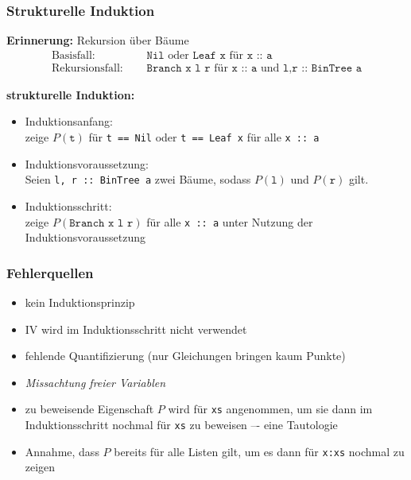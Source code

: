 \documentclass{beamer}
\begin{document}
\begin{frame} \frametitle{Strukturelle Induktion}
	\footnotesize
	
	\textbf{Erinnerung:} Rekursion über Bäume
	\begin{equation*}
		\begin{aligned}
			\text{Basisfall: } \quad &\texttt{Nil} \text{ oder } \texttt{Leaf x} \text{ für } \texttt{x :: a} \\
			\text{Rekursionsfall: }\quad &\texttt{Branch x l r} \text{ für } \texttt{x :: a} \text{ und } \texttt{l,r :: BinTree a}
		\end{aligned}
	\end{equation*}
	\pause

	\begin{center}
	\end{center}
	\pause
	
	\textbf{strukturelle Induktion:} \vspace{-0.5\baselineskip}
	\begin{itemize}
		\item \textcolor{cdblue}{Induktionsanfang}: \\
		zeige $P(\texttt{t})$ für \texttt{t == Nil} oder \texttt{t == Leaf x} für alle \texttt{x :: a}
		\pause
		\item \textcolor{cdblue}{Induktionsvoraussetzung}:\\
		Seien \texttt{l, r :: BinTree a} zwei Bäume, sodass $P(\texttt{l})$ und $P(\texttt{r})$ gilt. \pause
		\item \textcolor{cdblue}{Induktionsschritt}: \\
		zeige $P(\texttt{Branch x l r})$ für alle \texttt{x :: a} unter Nutzung der Induktionsvoraussetzung
		\pause
	\end{itemize}
	
\end{frame}

\begin{frame} \frametitle{Fehlerquellen}
	\footnotesize
	\begin{itemize}
		\item kein Induktionsprinzip
		\item IV wird im Induktionsschritt nicht verwendet
		\item fehlende Quantifizierung (nur Gleichungen bringen kaum Punkte)
		\item \textit{Missachtung freier Variablen} \pause
		\item zu beweisende Eigenschaft $P$ wird für \texttt{xs} angenommen, um sie dann im Induktionsschritt nochmal für \texttt{xs} zu beweisen –- eine Tautologie
		\item Annahme, dass $P$ bereits für alle Listen gilt, um es dann für \texttt{x:xs} nochmal zu zeigen		
	\end{itemize}
\end{frame}
\end{document}
